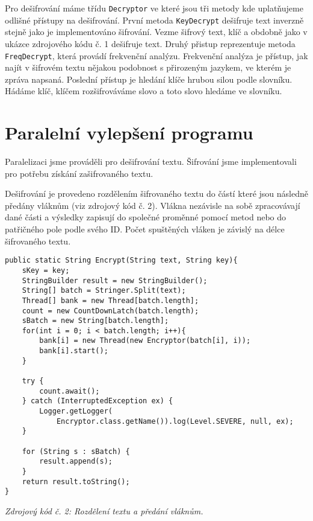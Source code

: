 \documentclass{article}
\begin{document}
Pro dešifrování máme třídu \texttt{Decryptor} ve které jsou tři metody kde uplatňujeme
odlišné přístupy na dešifrování. První metoda \texttt{KeyDecrypt} dešifruje text inverzně
stejně jako je implementováno šifrování. Vezme šifrový text, klíč a obdobně jako v ukázce
zdrojového kódu č. 1 dešifruje text. Druhý přistup reprezentuje metoda \texttt{FreqDecrypt},
která provádí frekvenční analýzu. Frekvenční analýza je přístup, jak najít v šifrovém textu
nějakou podobnost s přirozeným jazykem, ve kterém je zpráva napsaná. Poslední přístup je
hledání klíče hrubou silou podle slovníku. Hádáme klíč, klíčem rozšifrováváme slovo a toto
slovo hledáme ve slovníku.
\newline

\section{Paralelní vylepšení programu}
Paralelizaci jsme prováděli pro dešifrování textu. Šifrování jsme implementovali pro
potřebu získání zašifrovaného textu.

Dešifrování je provedeno rozdělením šifrovaného textu do částí které jsou následně
předány vláknům (viz zdrojový kód č. 2).
Vlákna nezávisle na sobě zpracovávají dané části a výsledky zapisují
do společné proměnné pomocí metod nebo do patřičného pole podle svého ID. Počet
spuštěných vláken je závislý na délce šifrovaného textu.

\begin{center}
\begin{lstlisting}
public static String Encrypt(String text, String key){
	sKey = key;
	StringBuilder result = new StringBuilder();
	String[] batch = Stringer.Split(text);
	Thread[] bank = new Thread[batch.length];
	count = new CountDownLatch(batch.length);
	sBatch = new String[batch.length];
	for(int i = 0; i < batch.length; i++){
		bank[i] = new Thread(new Encryptor(batch[i], i));
		bank[i].start();
	}
	
	try {
		count.await();
	} catch (InterruptedException ex) {
		Logger.getLogger(
			Encryptor.class.getName()).log(Level.SEVERE, null, ex);
	}
	
	for (String s : sBatch) {
		result.append(s);
	}
	return result.toString();
}
\end{lstlisting}
\vspace{1mm}
\textit{Zdrojový kód č. 2: Rozdělení textu a předání vláknům.}
\end{center}
\end{document}
